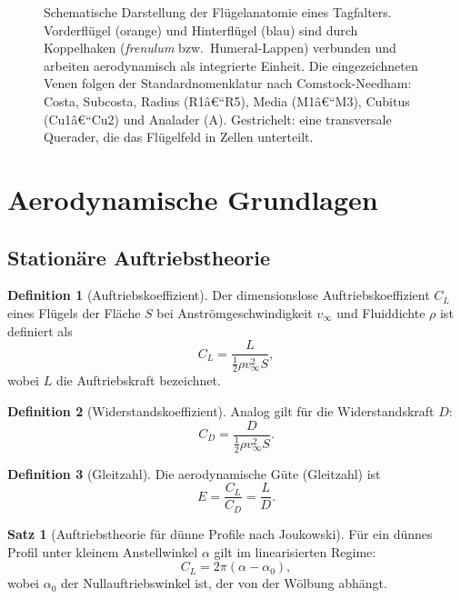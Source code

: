 ﻿\documentclass[a4paper,12pt]{article}
\theoremstyle{definition}
\newtheorem{definition}{Definition}
\newtheorem{satz}{Satz}
\begin{document}
\begin{figure}[H]
		\caption{Schematische Darstellung der Flügelanatomie eines Tagfalters.
			Vorderflügel (orange) und Hinterflügel (blau) sind durch Koppelhaken
			(\textit{frenulum} bzw.\ Humeral-Lappen) verbunden und arbeiten aerodynamisch
			als integrierte Einheit. Die eingezeichneten Venen folgen der Standardnomenklatur
			nach Comstock-Needham: Costa, Subcosta, Radius (R1â€“R5), Media (M1â€“M3),
			Cubitus (Cu1â€“Cu2) und Analader (A). Gestrichelt: eine transversale Querader,
			die das Flügelfeld in Zellen unterteilt.}
		\label{fig:anatomie_tikz}
	\end{figure}
	
	\section{Aerodynamische Grundlagen}
	\label{sec:aerodynamik}
	
	\subsection{Stationäre Auftriebstheorie}
	
	\begin{definition}[Auftriebskoeffizient]
		Der dimensionslose Auftriebskoeffizient $C_L$ eines Flügels der Fläche $S$ bei
		Anströmgeschwindigkeit $v_\infty$ und Fluiddichte $\rho$ ist definiert als
		\[
		C_L = \frac{L}{\frac{1}{2}\rho v_\infty^2 S},
		\]
		wobei $L$ die Auftriebskraft bezeichnet.
	\end{definition}
	
	\begin{definition}[Widerstandskoeffizient]
		Analog gilt für die Widerstandskraft $D$:
		\[
		C_D = \frac{D}{\frac{1}{2}\rho v_\infty^2 S}.
		\]
	\end{definition}
	
	\begin{definition}[Gleitzahl]
		Die aerodynamische Güte (Gleitzahl) ist
		\[
		E = \frac{C_L}{C_D} = \frac{L}{D}.
		\]
	\end{definition}
	
	\begin{satz}[Auftriebstheorie für dünne Profile nach Joukowski]
		\label{satz:joukowski}
		Für ein dünnes Profil unter kleinem Anstellwinkel $\alpha$ gilt im linearisierten Regime:
		\[
		C_L = 2\pi (\alpha - \alpha_0),
		\]
		wobei $\alpha_0$ der Nullauftriebswinkel ist, der von der Wölbung abhängt.
	\end{satz}
	
\end{document}
